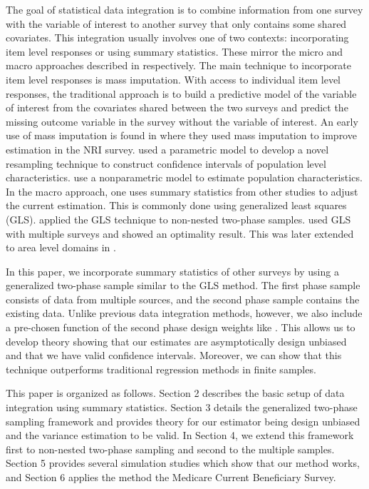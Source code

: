 \documentclass[12pt]{article}
\begin{document}
The goal of statistical data integration is to combine information from one
survey with the variable of interest to another survey that only contains some
shared covariates. 
This integration usually involves one of two contexts: incorporating item
level responses or using summary statistics. These mirror the micro and macro
approaches described in \cite{yang2020statistical} respectively. The main
technique to incorporate item level responses is mass imputation. With access to
individual item level responses, the traditional approach is to build a
predictive model of the variable of interest from the covariates shared between
the two surveys and predict the missing outcome variable in the survey without
the variable of interest. An early use of mass imputation is found in
\cite{breidt1996two} where they used mass imputation to improve estimation in
the NRI survey. \cite{kim2012combining} used a parametric model to develop a
novel resampling technique to construct confidence intervals of population level
characteristics. \cite{chen2022nonparametric} use a nonparametric model to
estimate population characteristics. In the macro approach, one uses summary
statistics from other studies to adjust the current estimation. This is commonly
done using generalized least squares (GLS). 
\cite{hidiroglou2001double} applied the GLS technique to non-nested two-phase
samples. \cite{merkouris2004combining} used GLS with multiple surveys and showed
an optimality result. This was later extended to area level domains in 
\cite{merkouris2010combining}.

In this paper, we incorporate summary statistics of other surveys by
using a generalized two-phase sample similar to the GLS method. The first phase
sample consists of data
from multiple sources, and the second phase sample contains the existing
data. Unlike previous data integration methods, however, we also include a
pre-chosen function of the second phase design weights like
\cite{kwon2024debiased}. This allows us to develop theory showing that our
estimates are asymptotically design unbiased and that we have valid confidence
intervals. Moreover, we can show that this technique outperforms traditional
regression methods in finite samples.

This paper is organized as follows. Section 2 describes the basic setup of data
integration using summary statistics. Section 3 details the generalized
two-phase sampling framework and provides theory for our estimator being design
unbiased and the variance estimation to be valid. In Section 4, we extend this
framework first to non-nested two-phase sampling and second to the multiple
samples. Section 5 provides several simulation studies which show that our
method works, and Section 6 applies the method the Medicare Current Beneficiary
Survey. 
\end{document}
